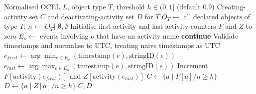 \begin{algorithm}[tbp]
\caption{Object creation and deactivation discovery}
\label{alg:object-initialization-exit-discovery}
\begin{algorithmic}[1]
\Require Normalised OCEL $L$, object type $T$, threshold $h\in(0,1]$ (default $0.9$)
\Ensure Creating-activity set $C$ and deactivating-activity set $D$ for $T$
\State $O_T\gets$ all declared objects of type $T$; $n\gets|O_T|$
 \State \Return $\emptyset,\emptyset$ \EndIf
\State Initialise first-activity and last-activity counters $F$ and $Z$ to zero
    \State $E_o\gets$ events involving $o$ that have an activity name
     \State \textbf{continue} \EndIf
    \State Validate timestamps and normalise to UTC, treating naive timestamps as UTC
    \State $e_{first}\gets\arg\min_{e\in E_o}(\mathrm{timestamp}(e),\mathrm{stringID}(e))$
    \State $e_{last}\gets\arg\max_{e\in E_o}(\mathrm{timestamp}(e),\mathrm{stringID}(e))$
    \State Increment $F[\mathrm{activity}(e_{first})]$ and $Z[\mathrm{activity}(e_{last})]$
\EndFor
\State $C\gets\{a\mid F[a]/n\ge h\}$
\State $D\gets\{a\mid Z[a]/n\ge h\}$ 
\State \Return $C,D$
\end{algorithmic}
\end{algorithm}
